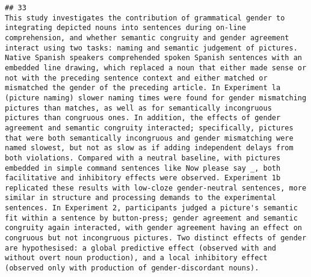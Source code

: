 \documentclass[
  english,
  man]{apa6}
\begin{document}
\begin{verbatim}
## 33                                                                                                                                                                                                                                                                                                                                                                                                                                                                                                                                                                                                                                                                                                                                                                                                                                                                              This study investigates the contribution of grammatical gender to integrating depicted nouns into sentences during on-line comprehension, and whether semantic congruity and gender agreement interact using two tasks: naming and semantic judgement of pictures. Native Spanish speakers comprehended spoken Spanish sentences with an embedded line drawing, which replaced a noun that either made sense or not with the preceding sentence context and either matched or mismatched the gender of the preceding article. In Experiment la (picture naming) slower naming times were found for gender mismatching pictures than matches, as well as for semantically incongruous pictures than congruous ones. In addition, the effects of gender agreement and semantic congruity interacted; specifically, pictures that were both semantically incongruous and gender mismatching were named slowest, but not as slow as if adding independent delays from both violations. Compared with a neutral baseline, with pictures embedded in simple command sentences like Now please say _, both facilitative and inhibitory effects were observed. Experiment 1b replicated these results with low-cloze gender-neutral sentences, more similar in structure and processing demands to the experimental sentences. In Experiment 2, participants judged a picture's semantic fit within a sentence by button-press; gender agreement and semantic congruity again interacted, with gender agreement having an effect on congruous but not incongruous pictures. Two distinct effects of gender are hypothesised: a global predictive effect (observed with and without overt noun production), and a local inhibitory effect (observed only with production of gender-discordant nouns).

\end{verbatim}
\end{document}
